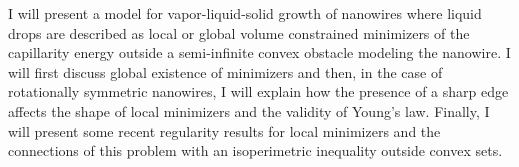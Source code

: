 \mypage
{}
\begin{myabstract}
I will present a model for vapor-liquid-solid growth of nanowires where liquid drops are described as local or global volume
constrained minimizers of the capillarity energy outside a semi-infinite convex obstacle modeling the nanowire. I will first discuss global existence of minimizers and then, in the case of rotationally symmetric nanowires, I will explain how the presence of a sharp edge affects the shape of local minimizers and the validity of Young's law. Finally, I will present some recent regularity results for local minimizers and the connections of this problem with an isoperimetric inequality outside convex sets.
\end{myabstract}
